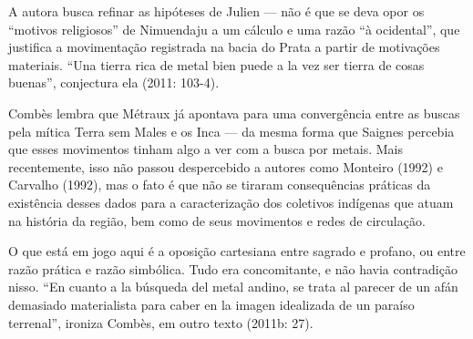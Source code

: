 \documentclass{article}
\begin{document}
A autora busca refinar as hip\'oteses de Julien --- n\~ao \'e que se
deva opor os {\textquotedblleft}motivos religiosos{\textquotedblright}
de Nimuendaju a um c\'alculo e uma raz\~ao {\textquotedblleft}\`a
ocidental{\textquotedblright}, que justifica a movimenta\c{c}\~ao
registrada na bacia do Prata a partir de motiva\c{c}\~oes materiais.
{\textquotedblleft}Una {\textquotesingle}tierra rica{\textquotesingle}
de metal bien puede a la vez ser tierra de {\textquotesingle}cosas
buenas{\textquotesingle}{\textquotedblright}, conjectura ela (2011:
103-4).

Comb\`es lembra que M\'etraux j\'a apontava para uma converg\^encia
entre as buscas pela m\'itica Terra sem Males e os Inca --- da mesma
forma que Saignes percebia que esses movimentos tinham algo a ver com a
busca por metais. Mais recentemente, isso n\~ao passou despercebido a
autores como Monteiro (1992) e Carvalho (1992), mas o fato \'e que
n\~ao se tiraram consequ\^encias pr\'aticas da exist\^encia desses
dados para a caracteriza\c{c}\~ao dos coletivos ind\'igenas que atuam
na hist\'oria da regi\~ao, bem como de seus movimentos e redes de
circula\c{c}\~ao.

O que est\'a em jogo aqui \'e a oposi\c{c}\~ao cartesiana entre sagrado
e profano, ou entre raz\~ao pr\'atica e raz\~ao simb\'olica. Tudo era
concomitante, e n\~ao havia contradi\c{c}\~ao nisso.
{\textquotedblleft}En cuanto a la b\'usqueda del metal andino, se trata
al parecer de un af\'an demasiado
{\textquotesingle}materialista{\textquotesingle} para caber en la
imagen idealizada de un para\'iso terrenal{\textquotedblright}, ironiza
Comb\`es, em outro texto (2011b: 27).
\end{document}
